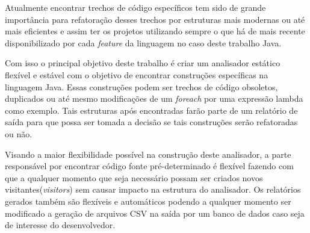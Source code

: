 Atualmente encontrar trechos de código específicos tem sido de grande importância para refatoração desses trechos por estruturas mais modernas ou até mais eficientes e assim ter os projetos utilizando sempre o que há de mais recente disponibilizado por cada \textit{feature} da linguagem no caso deste trabalho Java.

Com isso o principal objetivo deste trabalho é criar um analisador estático flexível e estável com o objetivo de encontrar construções específicas na linguagem Java. Essas construções podem ser trechos de código obsoletos, duplicados ou até mesmo modificações de um \textit{foreach} por uma expressão lambda como exemplo. Tais estruturas após encontradas farão parte de um relatório de saída para que possa ser tomada a decisão se tais construções serão refatoradas ou não.

Visando a maior flexibilidade possível na construção deste analisador, a parte responsável por encontrar código fonte pré-determinado é flexível fazendo com que a qualquer momento que seja necessário possam ser criados novos visitantes(\textit{visitors}) sem causar impacto na estrutura do analisador. Os relatórios gerados também são flexíveis e automáticos podendo a qualquer momento ser modificado a geração de arquivos CSV na saída por um banco de dados caso seja de interesse do desenvolvedor.

